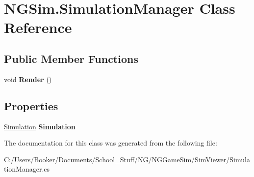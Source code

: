 \hypertarget{class_n_g_sim_1_1_simulation_manager}{}\section{N\+G\+Sim.\+Simulation\+Manager Class Reference}
\label{class_n_g_sim_1_1_simulation_manager}
\subsection*{Public Member Functions}
\begin{DoxyCompactItemize}
\item 
\mbox{\label{class_n_g_sim_1_1_simulation_manager_a41cad19a26c46f9be7f10bff0dfcae0a}} 
void {\bfseries Render} ()
\end{DoxyCompactItemize}
\subsection*{Properties}
\begin{DoxyCompactItemize}
\item 
\mbox{\label{class_n_g_sim_1_1_simulation_manager_adb685990c6730583f5bd7ac171264f11}} 
\hyperlink{class_n_g_a_p_i_1_1_simulation}{Simulation} {\bfseries Simulation}
\end{DoxyCompactItemize}


The documentation for this class was generated from the following file\+:\begin{DoxyCompactItemize}
\item 
C\+:/\+Users/\+Booker/\+Documents/\+School\+\_\+\+Stuff/\+N\+G/\+N\+G\+Game\+Sim/\+Sim\+Viewer/Simulation\+Manager.\+cs\end{DoxyCompactItemize}
